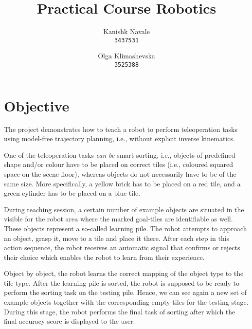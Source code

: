 \documentclass[a4paper,11pt,twoside]{article}
\begin{document}
\author{
  Kanishk Navale\\
  \texttt{3437531}
  \and
  Olga Klimashevska\\
  \texttt{3525388}
}


\title{Practical Course Robotics}


\maketitle


\section{Objective} \label{Sec:Obj}
The project demonstrates how to teach a robot to perform teleoperation tasks using model-free trajectory planning, i.e., without explicit inverse kinematics. 

One of the teleoperation tasks \textit{can be} smart sorting, i.e., objects of predefined shape and/or colour have to be placed on correct tiles (i.e., coloured squared space on the scene floor), whereas objects do not necessarily have to be of the same size. More specifically, a yellow brick has to be placed on a red tile, and a green cylinder has to be placed on a blue tile. 

During  teaching session, a certain number of example objects are situated in the visible for the robot area where the marked goal-tiles are identifiable as well. These objects represent a so-called learning pile. The robot attempts to approach an object, grasp it, move to a tile and place it there. After each step in this action sequence, the robot receives an automatic signal that confirms or rejects their choice which enables the robot to learn from their experience. 

Object by object, the robot learns the correct mapping of the object type to the tile type. After the learning pile is sorted, the robot is supposed to be ready to perform the sorting task on the testing pile. Hence, we can see again a new set of example objects together with the corresponding empty tiles for the testing stage. During this stage, the robot performs the final task of sorting after which the final accuracy score is displayed to the user.
\end{document}
